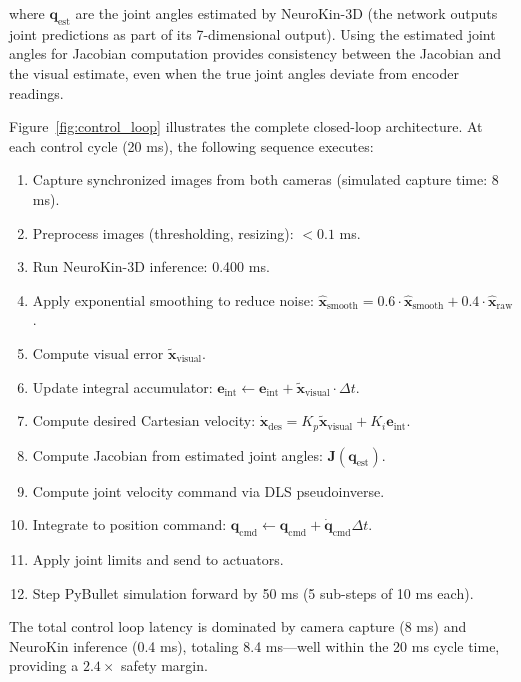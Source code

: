 \documentclass[12pt,a4paper,oneside]{report}
\begin{document}
where $\mathbf{q}_{\text{est}}$ are the joint angles estimated by NeuroKin-3D (the network outputs joint predictions as part of its 7-dimensional output). Using the estimated joint angles for Jacobian computation provides consistency between the Jacobian and the visual estimate, even when the true joint angles deviate from encoder readings.

Figure~\ref{fig:control_loop} illustrates the complete closed-loop architecture. At each control cycle (20 ms), the following sequence executes:

\begin{enumerate}
    \item Capture synchronized images from both cameras (simulated capture time: 8 ms).
    \item Preprocess images (thresholding, resizing): $<0.1$ ms.
    \item Run NeuroKin-3D inference: 0.400 ms.
    \item Apply exponential smoothing to reduce noise: $\hat{\mathbf{x}}_{\text{smooth}} = 0.6 \cdot \hat{\mathbf{x}}_{\text{smooth}} + 0.4 \cdot \hat{\mathbf{x}}_{\text{raw}}$.
    \item Compute visual error $\tilde{\mathbf{x}}_{\text{visual}}$.
    \item Update integral accumulator: $\mathbf{e}_{\text{int}} \leftarrow \mathbf{e}_{\text{int}} + \tilde{\mathbf{x}}_{\text{visual}} \cdot \Delta t$.
    \item Compute desired Cartesian velocity: $\dot{\mathbf{x}}_{\text{des}} = K_p \tilde{\mathbf{x}}_{\text{visual}} + K_i \mathbf{e}_{\text{int}}$.
    \item Compute Jacobian from estimated joint angles: $\mathbf{J}(\mathbf{q}_{\text{est}})$.
    \item Compute joint velocity command via DLS pseudoinverse.
    \item Integrate to position command: $\mathbf{q}_{\text{cmd}} \leftarrow \mathbf{q}_{\text{cmd}} + \dot{\mathbf{q}}_{\text{cmd}} \Delta t$.
    \item Apply joint limits and send to actuators.
    \item Step PyBullet simulation forward by 50 ms (5 sub-steps of 10 ms each).
\end{enumerate}

The total control loop latency is dominated by camera capture (8 ms) and NeuroKin inference (0.4 ms), totaling 8.4 ms—well within the 20 ms cycle time, providing a $2.4\times$ safety margin.
\end{document}
